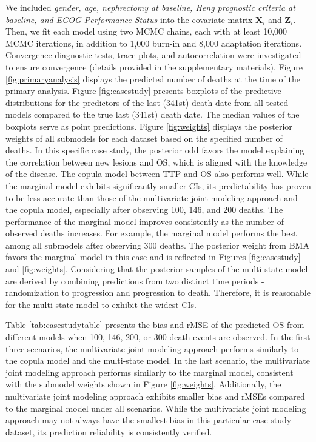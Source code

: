 \documentclass[aoas]{imsart}
\theoremstyle{plain}
\theoremstyle{remark}
\begin{document}
We included \textit{gender, age, nephrectomy at baseline, Heng prognostic criteria at baseline, and ECOG Performance Status} into the covariate matrix $\textbf{X}_i$ and $\textbf{Z}_i$. Then, we fit each model using two MCMC chains, each with at least 10,000 MCMC iterations, in addition to 1,000 burn-in and 8,000 adaptation iterations. Convergence diagnostic tests, trace plots, and autocorrelation were investigated to ensure convergence (details provided in the supplementary materials). Figure \ref{fig:primaryanalysis} displays the predicted number of deaths at the time of the primary analysis. Figure \ref{fig:casestudy} presents boxplots of the predictive distributions for the predictors of the last (341st) death date from all tested models compared to the true last (341st) death date. The median values of the boxplots serve as point predictions. Figure \ref{fig:weights} displays the posterior weights of all submodels for each dataset based on the specified number of deaths. In this specific case study, the posterior odd favors the model explaining the correlation between new lesions and OS, which is aligned with the knowledge of the disease. The copula model between TTP and OS also performs well. While the marginal model exhibits significantly smaller CIs, its predictability has proven to be less accurate than those of the multivariate joint modeling approach and the copula model, especially after observing 100, 146, and 200 deaths. The performance of the marginal model improves consistently as the number of observed deaths increases. For example, the marginal model performs the best among all submodels after observing 300 deaths. The posterior weight from BMA favors the marginal model in this case and is reflected in Figures \ref{fig:casestudy} and \ref{fig:weights}. Considering that the posterior samples of the multi-state model are derived by combining predictions from two distinct time periods - randomization to progression and progression to death. Therefore,  it is reasonable for the multi-state model to exhibit the widest CIs. 

Table \ref{tab:casestudytable} presents the bias and rMSE of the predicted OS from different models when 100, 146, 200, or 300 death events are observed. In the first three scenarios, the multivariate joint modeling approach performs similarly to the copula model and the multi-state model. In the last scenario, the multivariate joint modeling approach performs similarly to the marginal model, consistent with the submodel weights shown in Figure \ref{fig:weights}. Additionally, the multivariate joint modeling approach exhibits smaller bias and rMSEs compared to the marginal model under all scenarios. While the multivariate joint modeling approach may not always have the smallest bias in this particular case study dataset, its prediction reliability is consistently verified. 
\end{document}
